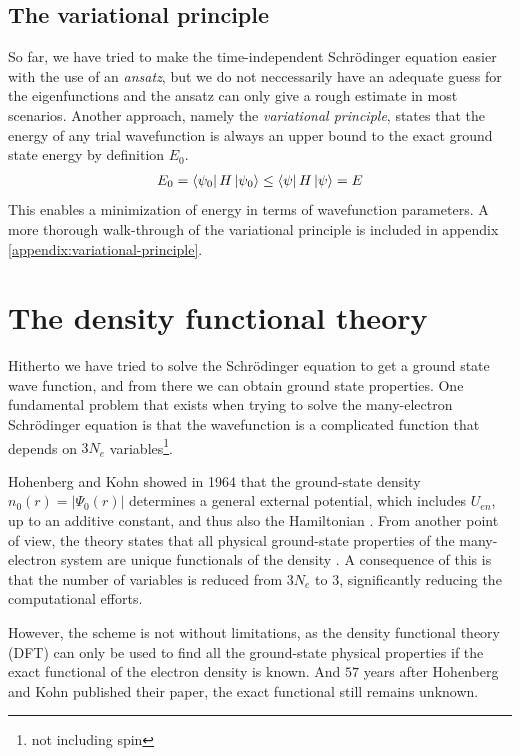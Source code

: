 \subsection{The variational principle}
So far, we have tried to make the time-independent Schrödinger equation easier with the use of an \textit{ansatz}, but we do not neccessarily have an adequate guess for the eigenfunctions and the ansatz can only give a rough estimate in most scenarios. Another approach, namely the \textit{variational principle}, states that the energy of any trial wavefunction is always an upper bound to the exact ground state energy by definition $E_0$.
\begin{align}
  E_0 = \bra{\psi_0 } H \ket{\psi_0} \leq \bra{\psi}H\ket{\psi} = E
\end{align} This enables a minimization of energy in terms of wavefunction parameters. A more thorough walk-through of the variational principle is included in appendix \autoref{appendix:variational-principle}.

\section{The density functional theory}

Hitherto we have tried to solve the Schrödinger equation to get a ground state wave function, and from there we can obtain ground state properties. One fundamental problem that exists when trying to solve the many-electron Schrödinger equation is that the wavefunction is a complicated function that depends on $3N_e$ variables\footnote{not including spin}.

Hohenberg and Kohn \cite{Hohenberg1964} showed in 1964 that the ground-state density $n_0(r) = \lvert \Psi_0 (r)\rvert$ determines a general external potential, which includes $U_{en}$, up to an additive constant, and thus also the Hamiltonian \cite{Toulouse2019}. From another point of view, the theory states that all physical ground-state properties of the many-electron system are unique functionals of the density \cite{Persson2020}. A consequence of this is that the number of variables is reduced from $3N_e$ to $3$, significantly reducing the computational efforts.

However, the scheme is not without limitations, as the density functional theory (DFT) can only be used to find all the ground-state physical properties if the exact functional of the electron density is known. And $57$ years after Hohenberg and Kohn published their paper, the exact functional still remains unknown.

